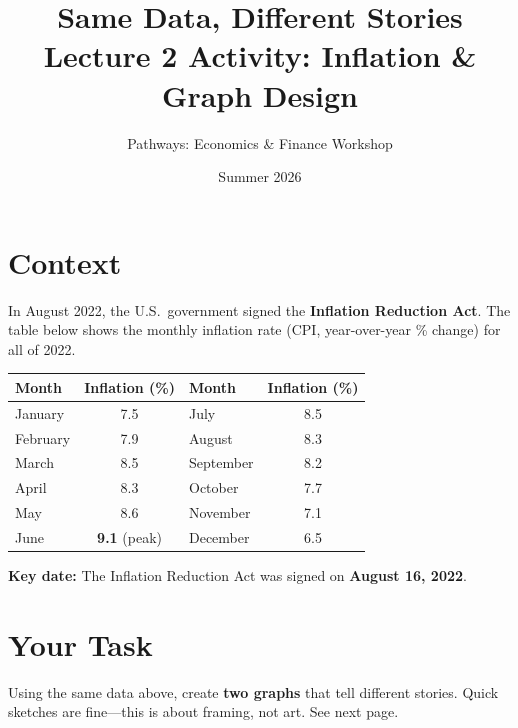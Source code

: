 \documentclass[letterpaper,10pt]{article}
\title{\textbf{Same Data, Different Stories}\\[0.3em]
{\large Lecture 2 Activity: Inflation \& Graph Design}}
\author{Pathways: Economics \& Finance Workshop}
\date{Summer 2026}
\begin{document}
\maketitle
\thispagestyle{empty}

\section*{Context}

In August 2022, the U.S.\ government signed the \textbf{Inflation Reduction Act}.
The table below shows the monthly inflation rate (CPI, year-over-year \% change)
for all of 2022.

\vspace{0.5em}
\begin{center}
\begin{tabular}{l c l c}
  \toprule
  \textbf{Month} & \textbf{Inflation (\%)} & \textbf{Month} & \textbf{Inflation (\%)} \\
  \midrule
  January   & 7.5 & July      & 8.5 \\
  February  & 7.9 & August    & 8.3 \\
  March     & 8.5 & September & 8.2 \\
  April     & 8.3 & October   & 7.7 \\
  May       & 8.6 & November  & 7.1 \\
  June      & \textbf{9.1} (peak) & December  & 6.5 \\
  \bottomrule
\end{tabular}
\end{center}

\vspace{0.3em}
\noindent\textbf{Key date:} The Inflation Reduction Act was signed on \textbf{August 16, 2022}.

\section*{Your Task}

Using the same data above, create \textbf{two graphs} that tell different stories.
Quick sketches are fine---this is about framing, not art. See next page.

\newpage
\end{document}
